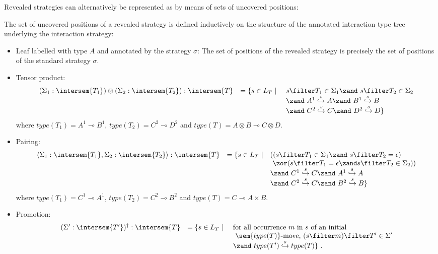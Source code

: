 Revealed strategies can alternatively be represented as by means
of sets of uncovered positions:
\begin{definition}
\label{dfn:revealedstrat}
The set of uncovered positions of a revealed strategy is defined inductively on the
structure of the annotated interaction type tree underlying the
interaction strategy:
\begin{itemize}[-]
\item Leaf labelled with type $A$ and annotated by the strategy $\sigma$: The set of positions of the revealed strategy is precisely the set of positions of the standard strategy $\sigma$.


\item Tensor product: $$\begin{array}{lcll}
(\Sigma_1 : \intersem{T_1}) \otimes (\Sigma_2 : \intersem{T_2}) : \intersem{T} &=\{ s \in L_T \ | \  &s \filter T_1 \in \Sigma_1 \zand\ s \filter T_2 \in \Sigma_2 \\
&& \zand\ A^1\stackrel{s}\hookrightarrow A  \zand\ B^1\stackrel{s}\hookrightarrow B \\
&& \zand\ C^2\stackrel{s}\hookrightarrow C  \zand\ D^2\stackrel{s}\hookrightarrow D \}
\end{array}$$
where $type(T_1) = A^1\multimap B^1$,
$type(T_2) = C^2\multimap D^2$
and $type(T) = A\otimes B \multimap C \otimes D$.

\item Pairing: $$\begin{array}{lcll}
\langle \Sigma_1 : \intersem{T_1}, \Sigma_2 : \intersem{T_2} \rangle : \intersem{T} &= \{ s \in L_T \ | &
   ( (s \filter T_1 \in \Sigma_1 \zand\ s \filter T_2 = \epsilon) \\
&&  \   \zor ( s \filter T_1 = \epsilon \zand s \filter T_2 \in \Sigma_2)) \\
&& \zand\ C^1\stackrel{s}\hookrightarrow C \zand\ A^1\stackrel{s}\hookrightarrow A  \\
&& \zand\ C^2\stackrel{s}\hookrightarrow C \zand\ B^2\stackrel{s}\hookrightarrow B  \}
\end{array}$$
where $type(T_1) = C^1\multimap A^1$,
$type(T_2) = C^2\multimap B^2$
and $type(T) = C\multimap A \times B$.

\item Promotion: $$\begin{array}{lcll}
(\Sigma' : \intersem{T'})^\dagger : \intersem{T} &= \{ s \in L_T \ | \ &
\mbox {for all occurrence $m$ in $s$ of an initial  }\\
&& \mbox{ $\sem{type(T)}$-move, $(s \filter m) \filter T' \in \Sigma'$} \\
&& \zand\ type(T')\stackrel{s}\hookrightarrow type(T) \} \ .
\end{array}$$


\end{itemize}
\end{definition}
